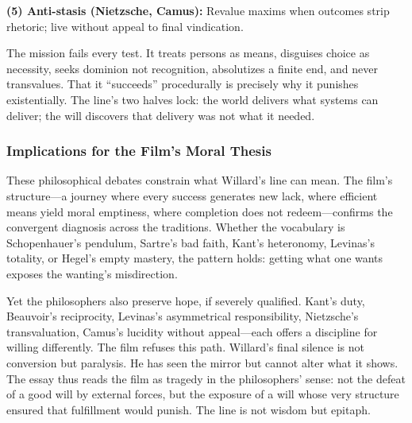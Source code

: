 \textbf{(5) Anti-stasis (Nietzsche, Camus):} Revalue maxims when outcomes strip rhetoric; live
without appeal to final vindication.

The mission fails every test. It treats persons as means, disguises choice as necessity, seeks
dominion not recognition, absolutizes a finite end, and never transvalues. That it
``succeeds'' procedurally is precisely why it punishes existentially. The line's two halves
lock: the world delivers what systems can deliver; the will discovers that delivery was not
what it needed.

\subsubsection*{Implications for the Film's Moral Thesis}

These philosophical debates constrain what Willard's line can mean. The film's structure---a
journey where every success generates new lack, where efficient means yield moral emptiness,
where completion does not redeem---confirms the convergent diagnosis across the traditions.
Whether the vocabulary is Schopenhauer's pendulum, Sartre's bad faith, Kant's heteronomy,
Levinas's totality, or Hegel's empty mastery, the pattern holds: getting what one wants
exposes the wanting's misdirection.

Yet the philosophers also preserve hope, if severely qualified. Kant's duty, Beauvoir's
reciprocity, Levinas's asymmetrical responsibility, Nietzsche's transvaluation, Camus's
lucidity without appeal---each offers a discipline for willing differently. The film refuses
this path. Willard's final silence is not conversion but paralysis. He has seen the mirror but
cannot alter what it shows. The essay thus reads the film as tragedy in the philosophers'
sense: not the defeat of a good will by external forces, but the exposure of a will whose very
structure ensured that fulfillment would punish. The line is not wisdom but epitaph.

